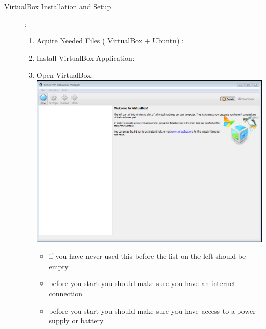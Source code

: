 \documentclass[12pt]{article}
\begin{document}
\begin{description}
\begin{itemize}
            \end{itemize}
	\newpage
		\item[VirtualBox Installation and Setup]: \vspace{10mm} \\


	\begin{enumerate}
\item  Aquire Needed Files ( VirtualBox + Ubuntu) : \vspace{5mm} \\
\item Install VirtualBox Application: \vspace{5mm} \\
    	\item Open VirtualBox: \vspace{20mm} \\
      		\includegraphics[scale=.6]{Capture1.png}\\
            \begin{itemize}
                
                \item if you have never used this before the list on the left should be empty
                
                \item before you start you should make sure you have an internet connection
                \item before you start you should make sure you have access to a power supply or battery
                

\end{itemize}
\end{enumerate}
\end{description}
\end{document}
